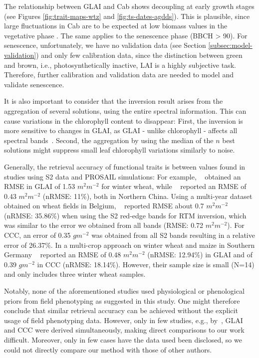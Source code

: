 The relationship between GLAI and Cab shows decoupling at early growth stages (see Figures \ref{fig:trait-maps-wtz} and \ref{fig:ts-dates-agdds}). This is plausible, since large fluctuations in Cab are to be expected at low biomass values in the vegetative phase \citep{lemaire_diagnosis_2008}. The same applies to the senescence phase (BBCH > 90). For senescence, unfortunately, we have no validation data (see Section \ref{subsec:model-validation}) and only few calibration data, since the distinction between green and brown, i.e., photosynthetically inactive, LAI is a highly subjective task. Therefore, further calibration and validation data are needed to model and validate senescence.

It is also important to consider that the inversion result arises from the aggregation of several solutions, using the entire spectral information. This can cause variations in the chlorophyll content to disappear: First, the inversion is more sensitive to changes in GLAI, as GLAI - unlike chlorophyll - affects all spectral bands~\citep{verrelst_global_2017}. Second, the aggregation by using the median of the $n$ best solutions might suppress small leaf chlorophyll variations similarly to noise.

Generally, the retrieval accuracy of functional traits is between values found in studies using S2 data and PROSAIL simulations: For example, ~\cite{xie_retrieval_2019} obtained an RMSE in GLAI of 1.53 $m^2m^{-2}$ for winter wheat, while ~\cite{pan_modeling_2019} reported an RMSE of 0.43 $m^2m^{-2}$ (nRMSE: 11\%), both in Northern China. Using a multi-year dataset obtained on wheat fields in Belgium, ~\cite{delloye_retrieval_2018} reported RMSE about 0.7 $m^2m^{-2}$ (nRMSE: 35.86\%) when using the S2 red-edge bands for RTM inversion, which was similar to the error we obtained from all bands (RMSE: 0.72 $m^2m^{-2}$). For CCC, an error of 0.35 $gm^{-2}$ was obtained from all S2 bands resulting in a relative error of 26.37\%. In a multi-crop approach on winter wheat and maize in Southern Germany ~\cite{estevez_top--atmosphere_2021} reported an RMSE of 0.48 $m^2m^{-2}$ (nRMSE: 12.94\%) in GLAI and of 0.39 $gm^{-2}$ in CCC (nRMSE: 18.14\%). However, their sample size is small (N=14) and only includes three winter wheat samples.

Notably, none of the aforementioned studies used physiological or phenological priors from field phenotyping as suggested in this study. One might therefore conclude that similar retrieval accuracy can be achieved without the explicit usage of field phenotyping data. However, only in few studies, e.g., by~\cite{delloye_retrieval_2018}, GLAI and CCC were derived simultaneously, making direct comparisons to our work difficult. Moreover, only in few cases have the data used been disclosed, so we could not directly compare our method with those of other authors.


